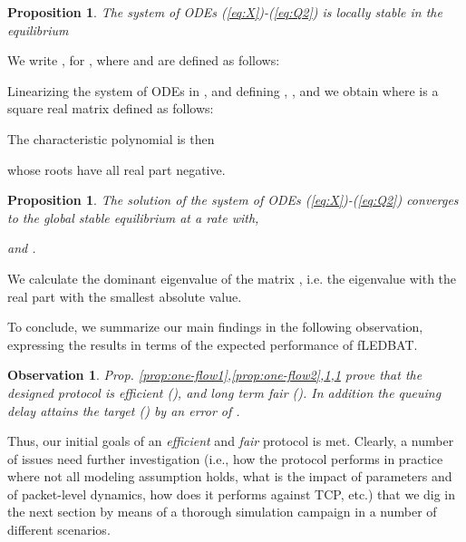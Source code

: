 \documentclass[conference]{IEEEtran}
\newtheorem{prop}[theorem]{Proposition}
\newtheorem{obs}[theorem]{Observation}
\newcommand{\fledbat}[0]{fLEDBAT}
\begin{document}
\begin{prop}\label{prop:one-flow3}
The system of ODEs (\ref{eq:X})-(\ref{eq:Q2}) is locally
stable in the equilibrium 
\end{prop}
\begin{IEEEproof}
We write , for ,  where  and 
are defined as follows:

Linearizing the system of ODEs in , and defining  , ,
and  we obtain  where  is a  square real matrix defined as follows:

The characteristic polynomial is then

whose roots have all real part negative.
\end{IEEEproof}
\begin{prop}\label{prop:one-flow4}
The solution of the system of ODEs (\ref{eq:X})-(\ref{eq:Q2}) converges to the
global stable equilibrium  at a rate  with,

and .
\end{prop}
\begin{IEEEproof}
We calculate the dominant eigenvalue of
the matrix , i.e. the eigenvalue with the real part
with the smallest absolute value.
\end{IEEEproof}
\noindent To conclude, we summarize our main findings in the following observation, expressing the results in terms 
of the expected performance of \fledbat.
\begin{obs}
Prop. \ref{prop:one-flow1},\ref{prop:one-flow2},\ref{prop:one-flow3},\ref{prop:one-flow4}
prove that the designed protocol is efficient (), and long term fair
(). In addition the queuing delay attains the target 
() by an error of .
\end{obs}

\noindent Thus, our initial goals of an \emph{efficient} and \emph{fair}
protocol is met. Clearly, a  number of issues need further investigation  (i.e., how the protocol performs in practice where not all modeling assumption holds, what is the impact of parameters and of packet-level dynamics, how does it performs against TCP, etc.) that we dig in the next section by means of a thorough simulation campaign in a number of different scenarios.
\end{document}
